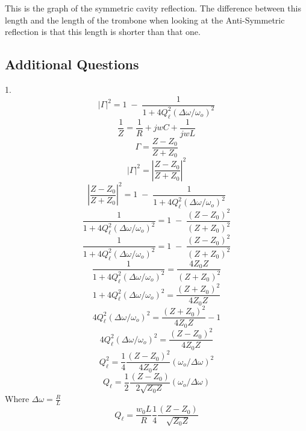 This is the graph of the symmetric cavity reflection. The difference between this length and the length of the trombone when looking at the Anti-Symmetric reflection is that this length is shorter than that one. 

\subsection{Additional Questions}
1. 
\begin{equation}
    |\Gamma|^2 = 1\; -\; \frac{1}{1+4 Q_\ell^2 (\Delta\omega/\omega_o)^2}
\end{equation}
\begin{equation}
    \frac{1}{Z} = \frac{1}{R} + jwC + \frac{1}{jwL}
\end{equation}
\begin{equation}
    \Gamma = \frac{Z-Z_0}{Z+Z_0}
\end{equation}
\begin{equation}
    |\Gamma|^2 = |\frac{Z-Z_0}{Z+Z_0}|^2 
\end{equation}
\begin{equation}
    |\frac{Z-Z_0}{Z+Z_0}|^2  = 1\; -\; \frac{1}{1+4 Q_\ell^2 (\Delta\omega/\omega_o)^2}
\end{equation}
\begin{equation}
   \frac{1}{1+4 Q_\ell^2 (\Delta\omega/\omega_o)^2} = 1\; -\;  \frac{(Z-Z_0)^2}{(Z+Z_0)^2}
\end{equation}
\begin{equation}
   \frac{1}{1+4 Q_\ell^2 (\Delta\omega/\omega_o)^2} = 1\; -\;  \frac{(Z-Z_0)^2}{(Z+Z_0)^2}
\end{equation}
\begin{equation}
   \frac{1}{1+4 Q_\ell^2 (\Delta\omega/\omega_o)^2} =\frac{4Z_0Z}{(Z+Z_0)^2}
\end{equation}
\begin{equation}
   1+4 Q_\ell^2 (\Delta\omega/\omega_o)^2 =\frac{(Z+Z_0)^2}{4Z_0Z}
\end{equation}
\begin{equation}
   4 Q_\ell^2 (\Delta\omega/\omega_o)^2 =\frac{(Z+Z_0)^2}{4Z_0Z} -1
\end{equation}
\begin{equation}
   4 Q_\ell^2 (\Delta\omega/\omega_o)^2 =\frac{(Z-Z_0)^2}{4Z_0Z} 
\end{equation}
\begin{equation}
   Q_\ell^2 =\frac{1}{4}\frac{(Z-Z_0)^2}{4Z_0Z} (\omega_o/\Delta\omega)^2
\end{equation}
\begin{equation}
   Q_\ell =\frac{1}{2}\frac{(Z-Z_0)}{2\sqrt{Z_0Z}} (\omega_o/\Delta\omega)
\end{equation}
Where $\Delta\omega = \frac{R}{L}$
\begin{equation}
    Q_\ell = \frac{w_0 L}{R}\frac{1}{4}\frac{(Z-Z_0)}{\sqrt{Z_0Z}}
\end{equation}

